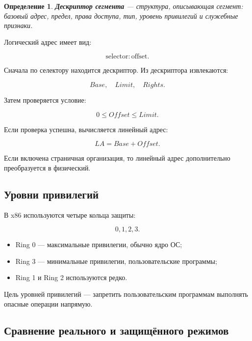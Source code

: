 \documentclass[a4paper,12pt]{article}
\newtheorem{definition}{Определение}
\begin{document}
\begin{definition}
\textbf{Дескриптор сегмента} --- структура, описывающая сегмент: базовый адрес, предел, права доступа, тип, уровень привилегий и служебные признаки.
\end{definition}

Логический адрес имеет вид:

\[
\text{selector} : \text{offset}.
\]

Сначала по селектору находится дескриптор. Из дескриптора извлекаются:

\[
Base,\quad Limit,\quad Rights.
\]

Затем проверяется условие:

\[
0 \leq Offset \leq Limit.
\]

Если проверка успешна, вычисляется линейный адрес:

\[
LA = Base + Offset.
\]

Если включена страничная организация, то линейный адрес дополнительно преобразуется в физический.

\subsection{Уровни привилегий}

В x86 используются четыре кольца защиты:

\[
0,1,2,3.
\]

\begin{itemize}
    \item Ring 0 --- максимальные привилегии, обычно ядро ОС;
    \item Ring 3 --- минимальные привилегии, пользовательские программы;
    \item Ring 1 и Ring 2 используются редко.
\end{itemize}

Цель уровней привилегий --- запретить пользовательским программам выполнять опасные операции напрямую.

\subsection{Сравнение реального и защищённого режимов}
\end{document}
